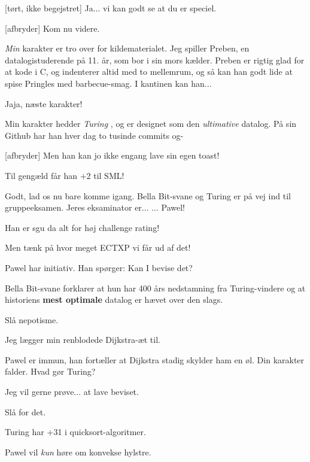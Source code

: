 \documentclass[a4paper,11pt]{article}
\begin{document}
\begin{sketch}
[tørt, ikke begejstret] Ja... vi kan godt se at du er speciel.

[afbryder] Kom nu videre.


 \textit{Min} karakter er tro over for kildematerialet.  Jeg spiller
Preben, en datalogistuderende på 11. år, som bor i sin mors kælder.  Preben er
rigtig glad for at kode i C, og indenterer altid med to mellemrum, og så kan han
godt lide at spise Pringles med barbecue-smag.  I kantinen kan han...

 Jaja, næste karakter!

 Min karakter hedder \textit{Turing} , og er
designet som den \textit{ultimative} datalog.  På sin Github har han hver dag to
tusinde commits og-

[afbryder] Men han kan jo ikke engang lave sin egen toast!

 Til gengæld får han +2 til SML!

 Godt, lad os nu bare komme igang.  Bella Bit-svane og Turing er på vej
ind til gruppeeksamen.  Jeres eksaminator er... ...  Pawel!


 Han er sgu da alt for høj challenge rating!

 Men tænk på hvor meget ECTXP vi får ud af det!

 Pawel har initiativ.  Han spørger: Kan I bevise det?

 Bella Bit-svane forklarer at hun har 400 års nedstamning fra
Turing-vindere og at historiens \textbf{mest optimale} datalog er hævet over den slags.

 Slå nepotisme.

 Jeg lægger min renblodede Dijkstra-æt til.


 Pawel er immun, han fortæller at Dijkstra stadig skylder ham en øl.
Din karakter falder.  Hvad gør Turing?

 Jeg vil gerne prøve... at lave beviset.

 Slå for det.

 Turing har +31 i quicksort-algoritmer.

 Pawel vil \textit{kun} høre om konvekse hylstre.


\end{sketch}
\end{document}
